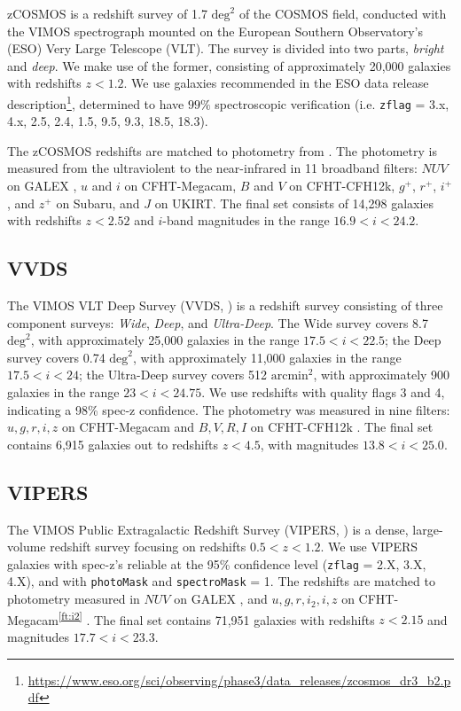 zCOSMOS \citep{Lilly2009a} is a redshift survey of 1.7 $\text{deg}^2$ of the COSMOS field, conducted with the VIMOS spectrograph mounted on the European Southern Observatory's (ESO) Very Large Telescope (VLT).
The survey is divided into two parts, \textit{bright} and \textit{deep}. 
We make use of the former, consisting of approximately 20,000 galaxies with redshifts $z < 1.2$.
We use galaxies recommended in the ESO data release description\footnote{\url{https://www.eso.org/sci/observing/phase3/data_releases/zcosmos_dr3_b2.pdf}}, determined to have $99\%$ spectroscopic verification (i.e. \texttt{zflag} = 3.x, 4.x, 2.5, 2.4, 1.5, 9.5, 9.3, 18.5, 18.3).

The zCOSMOS redshifts are matched to photometry from \citet{Ilbert2009}.
The photometry is measured from the ultraviolent to the near-infrared in 11 broadband filters: $NUV$ on GALEX \citep{Martin2005a}, $u$ and $i$ on CFHT-Megacam, $B$ and $V$ on CFHT-CFH12k, $g^+$, $r^+$, $i^+$, and $z^+$ on Subaru, and $J$ on UKIRT.
The final set consists of 14,298 galaxies with redshifts $z < 2.52$ and $i$-band magnitudes in the range $16.9 < i < 24.2$.

\subsection{VVDS}

The VIMOS VLT Deep Survey (VVDS, \citealt{LeFevre2013b}) is a redshift survey consisting of three component surveys: \textit{Wide}, \textit{Deep}, and \textit{Ultra-Deep}. 
The Wide survey covers 8.7 $\text{deg}^2$, with approximately 25,000 galaxies in the range $17.5 < i < 22.5$; the Deep survey covers 0.74 $\text{deg}^2$, with approximately 11,000 galaxies in the range $17.5 < i < 24$; the Ultra-Deep survey covers 512 $\text{arcmin}^2$, with approximately 900 galaxies in the range $23 < i < 24.75$.
We use redshifts with quality flags 3 and 4, indicating a 98\% spec-z confidence.
The photometry was measured in nine filters: $u,g,r,i,z$ on CFHT-Megacam \citep{Hudelot2012} and $B,V,R,I$ on CFHT-CFH12k \citep{LeFevre2004}.
The final set contains 6,915 galaxies out to redshifts $z < 4.5$, with magnitudes $ 13.8 < i < 25.0$.

\subsection{VIPERS}

The VIMOS Public Extragalactic Redshift Survey (VIPERS, \citealt{Scodeggio2018a}) is a dense, large-volume redshift survey focusing on redshifts $0.5 < z < 1.2$.
We use VIPERS galaxies with spec-z's reliable at the 95\% confidence level (\texttt{zflag} = 2.X, 3.X, 4.X), and with \texttt{photoMask} and \texttt{spectroMask} = 1.
The redshifts are matched to photometry measured in $NUV$ on GALEX \citep{Martin2005a}, and $u,g,r,i_2,i,z$ on CFHT-Megacam\textsuperscript{\ref{ft:i2}} \citep{Hudelot2012}. 
The final set contains 71,951 galaxies with redshifts $z < 2.15$ and magnitudes $17.7 < i < 23.3$. 

